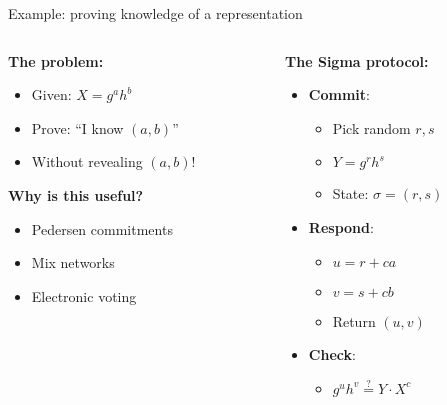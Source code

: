 \documentclass[aspectratio=169, lualatex, handout]{beamer}
\begin{document}
\begin{frame}{Example: proving knowledge of a representation}
	\begin{columns}[c]
		\begin{column}{0.5\textwidth}
			\textbf{The problem:}
			\begin{itemize}
				\item Given: $X = g^a h^b$
				\item Prove: ``I know $(a, b)$''
				\item Without revealing $(a, b)$!
			\end{itemize}
			\textbf{Why is this useful?}
			\begin{itemize}
				\item Pedersen commitments
				\item Mix networks
				\item Electronic voting
			\end{itemize}
		\end{column}
		\begin{column}{0.5\textwidth}
			\textbf{The Sigma protocol:}
			\begin{itemize}
				\item \textbf{Commit}:
				      \begin{itemize}
					      \item Pick random $r, s$
					      \item $Y = g^r h^s$
					      \item State: $\sigma = (r, s)$
				      \end{itemize}
				\item \textbf{Respond}:
				      \begin{itemize}
					      \item $u = r + ca$
					      \item $v = s + cb$
					      \item Return $(u, v)$
				      \end{itemize}
				\item \textbf{Check}:
				      \begin{itemize}
					      \item $g^u h^v \overset{?}{=} Y \cdot X^c$
				      \end{itemize}
			\end{itemize}
		\end{column}
	\end{columns}
\end{frame}
\end{document}
